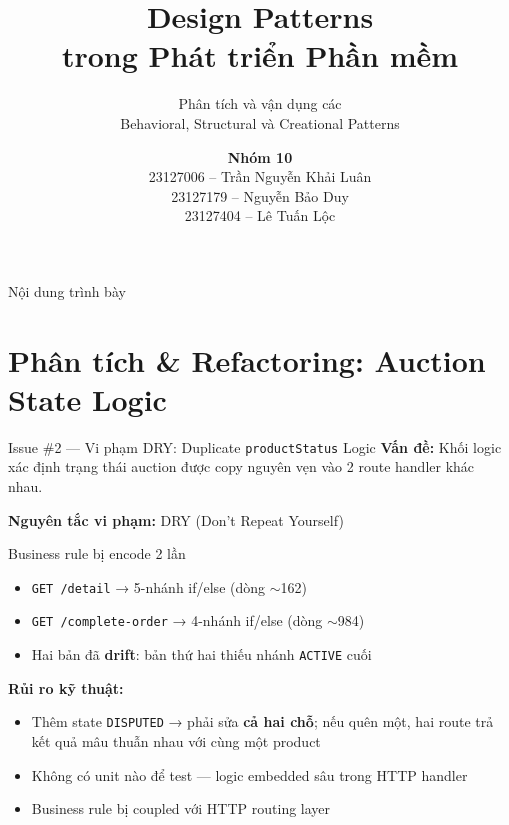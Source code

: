 \documentclass[12pt]{beamer}
\title[Design Patterns]{\large Design Patterns\\[0.2em]
\normalsize trong Phát triển Phần mềm}
\subtitle{\scriptsize Phân tích và vận dụng các\\[0.2em]
\scriptsize Behavioral, Structural và Creational Patterns}
\author[Nhóm 10]{\textbf{Nhóm 10}\\[0.35em]\scriptsize
23127006 -- Trần Nguyễn Khải Luân\\
23127179 -- Nguyễn Bảo Duy\\
23127404 -- Lê Tuấn Lộc}
\institute[HCMUS]{\scriptsize Trường Đại học Khoa học Tự nhiên, ĐHQG-HCM\\[0.25em]
\scriptsize \textit{Học phần:} Thiết kế phần mềm}
\begin{document}
\begin{frame}
  \titlepage 
\end{frame}

\begin{frame}{Nội dung trình bày}
  \tableofcontents
\end{frame}

\section{Phân tích \& Refactoring: Auction State Logic}

\begin{frame}{Issue \#2 — Vi phạm DRY: Duplicate \texttt{productStatus} Logic}
  \textbf{Vấn đề:} Khối logic xác định trạng thái auction được copy nguyên vẹn
  vào 2 route handler khác nhau.

  \bigskip
  \textbf{Nguyên tắc vi phạm:} \alert{DRY} (Don't Repeat Yourself)

  \bigskip
  \begin{block}{Business rule bị encode 2 lần}
    \begin{itemize}
      \item \texttt{GET /detail} → 5-nhánh if/else (dòng $\sim$162)
      \item \texttt{GET /complete-order} → 4-nhánh if/else (dòng $\sim$984)
      \item Hai bản đã \textbf{drift}: bản thứ hai thiếu nhánh \texttt{ACTIVE} cuối
    \end{itemize}
  \end{block}

  \bigskip
  \textbf{Rủi ro kỹ thuật:}
  \begin{itemize}
    \item Thêm state \texttt{DISPUTED} → phải sửa \textbf{cả hai chỗ}; nếu quên một, hai route trả kết quả mâu thuẫn nhau với cùng một product
    \item Không có unit nào để test — logic embedded sâu trong HTTP handler
    \item Business rule bị coupled với HTTP routing layer
  \end{itemize}
\end{frame}
\end{document}

